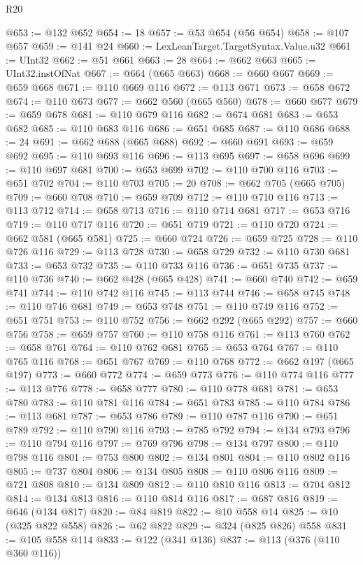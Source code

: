 \begin{lexlean}{R20}
\begin{coremodule}
@653 := @132 @652
@654 := 18
@657 := @53 @654 (@56 @654)
@658 := @107 @657
@659 := @141 @24
@660 := LexLeanTarget.TargetSyntax.Value.u32
@661 := UInt32
@662 := @51 @661
@663 := 28
@664 := @662 @663
@665 := UInt32.instOfNat
@667 := @664 (@665 @663)
@668 := @660 @667
@669 := @659 @668
@671 := @110 @669 @116
@672 := @113 @671
@673 := @658 @672
@674 := @110 @673
@677 := @662 @560 (@665 @560)
@678 := @660 @677
@679 := @659 @678
@681 := @110 @679 @116
@682 := @674 @681
@683 := @653 @682
@685 := @110 @683 @116
@686 := @651 @685
@687 := @110 @686
@688 := 24
@691 := @662 @688 (@665 @688)
@692 := @660 @691
@693 := @659 @692
@695 := @110 @693 @116
@696 := @113 @695
@697 := @658 @696
@699 := @110 @697 @681
@700 := @653 @699
@702 := @110 @700 @116
@703 := @651 @702
@704 := @110 @703
@705 := 20
@708 := @662 @705 (@665 @705)
@709 := @660 @708
@710 := @659 @709
@712 := @110 @710 @116
@713 := @113 @712
@714 := @658 @713
@716 := @110 @714 @681
@717 := @653 @716
@719 := @110 @717 @116
@720 := @651 @719
@721 := @110 @720
@724 := @662 @581 (@665 @581)
@725 := @660 @724
@726 := @659 @725
@728 := @110 @726 @116
@729 := @113 @728
@730 := @658 @729
@732 := @110 @730 @681
@733 := @653 @732
@735 := @110 @733 @116
@736 := @651 @735
@737 := @110 @736
@740 := @662 @428 (@665 @428)
@741 := @660 @740
@742 := @659 @741
@744 := @110 @742 @116
@745 := @113 @744
@746 := @658 @745
@748 := @110 @746 @681
@749 := @653 @748
@751 := @110 @749 @116
@752 := @651 @751
@753 := @110 @752
@756 := @662 @292 (@665 @292)
@757 := @660 @756
@758 := @659 @757
@760 := @110 @758 @116
@761 := @113 @760
@762 := @658 @761
@764 := @110 @762 @681
@765 := @653 @764
@767 := @110 @765 @116
@768 := @651 @767
@769 := @110 @768
@772 := @662 @197 (@665 @197)
@773 := @660 @772
@774 := @659 @773
@776 := @110 @774 @116
@777 := @113 @776
@778 := @658 @777
@780 := @110 @778 @681
@781 := @653 @780
@783 := @110 @781 @116
@784 := @651 @783
@785 := @110 @784
@786 := @113 @681
@787 := @653 @786
@789 := @110 @787 @116
@790 := @651 @789
@792 := @110 @790 @116
@793 := @785 @792
@794 := @134 @793
@796 := @110 @794 @116
@797 := @769 @796
@798 := @134 @797
@800 := @110 @798 @116
@801 := @753 @800
@802 := @134 @801
@804 := @110 @802 @116
@805 := @737 @804
@806 := @134 @805
@808 := @110 @806 @116
@809 := @721 @808
@810 := @134 @809
@812 := @110 @810 @116
@813 := @704 @812
@814 := @134 @813
@816 := @110 @814 @116
@817 := @687 @816
@819 := @646 (@134 @817)
@820 := @84 @819
@822 := @10 @558 @14
@825 := @10 (@325 @822 @558)
@826 := @62 @822
@829 := @324 (@825 @826) @558
@831 := @105 @558 @114
@833 := @122 (@341 @136)
@837 := @113 (@376 (@110 @360 @116))

\end{coremodule}
\end{lexlean}
